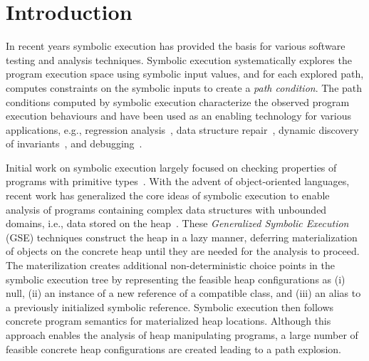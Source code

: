 \section{Introduction}

In recent years symbolic execution has provided the basis for various
software testing and analysis techniques. Symbolic execution
systematically explores the program execution space using symbolic
input values, and for each explored path, computes constraints on the
symbolic inputs to create a \emph{ path condition}.  The path
conditions computed by symbolic execution characterize the observed
program execution behaviours and have been used as an enabling
technology for various applications, e.g., regression
analysis~\cite{backes:2012,Godefroid:SAS11,Person:FSE08,person:pldi2011,Ramos:2011,Yang:ISSTA12},
data structure repair~\cite{KhurshidETAL05RepairingStructurally},
dynamic discovery of
invariants~\cite{CsallnerETAL08DySy,Zhang:ISSTA14}, and
debugging~\cite{Ma:2011}.

Initial work on symbolic execution largely focused on checking
properties of programs with primitive
types~\cite{clarke76TSE,King:76}.  With the advent of object-oriented
languages, recent work has generalized the core ideas of symbolic
execution to enable analysis of programs containing complex data
structures with unbounded domains, i.e., data stored on the
heap~\cite{Kiasan06,Kiasan07,GSE03}.  These \emph{Generalized Symbolic
  Execution} (GSE) techniques construct the heap in a lazy manner,
deferring materialization of objects on the concrete heap until they
are needed for the analysis to proceed. The materilization creates
additional non-deterministic choice points in the symbolic execution
tree by representing the feasible heap configurations as (i) null,
(ii) an instance of a new reference of a compatible class, and (iii)
an alias to a previously initialized symbolic reference.  Symbolic
execution then follows concrete program semantics for materialized
heap locations. Although this approach enables the analysis of heap
manipulating programs, a large number of feasible concrete heap
configurations are created leading to a path explosion.



